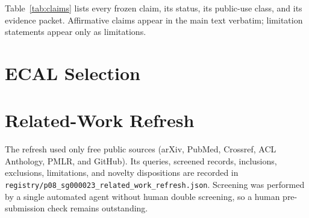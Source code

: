 \documentclass[11pt]{article}
\begin{document}
Table~\ref{tab:claims} lists every frozen claim, its status, its public-use class, and its evidence packet.
Affirmative claims appear in the main text verbatim; limitation statements appear only as limitations.



\section{ECAL Selection}
\label{app:ecal}



\section{Related-Work Refresh}
\label{app:literature}

The refresh used only free public sources (arXiv, PubMed, Crossref, ACL Anthology, PMLR, and GitHub). Its
queries, screened records, inclusions, exclusions, limitations, and novelty dispositions are recorded in
\texttt{registry/p08\_sg000023\_related\_work\_refresh.json}. Screening was performed by a single automated
agent without human double screening, so a human pre-submission check remains outstanding.
\end{document}
